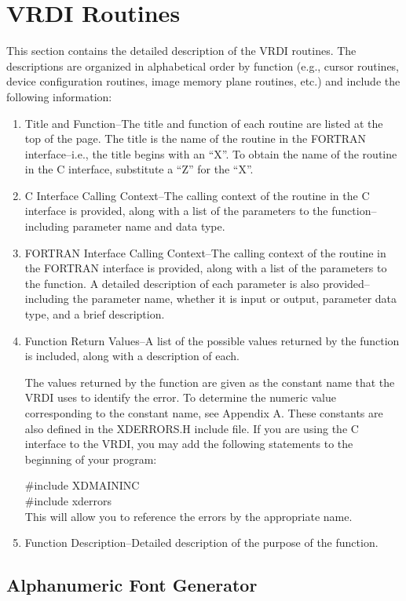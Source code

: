 \section{VRDI Routines}
\label{routines}
This section contains the detailed description of the VRDI
routines.  The descriptions are organized in alphabetical order
by function (e.g., cursor routines, device configuration routines,
image memory plane routines, etc.) and include the following
information:
\begin{enumerate}
\item Title and Function--The title and function of each routine are
listed at the top of the page.  The title is the name of the routine
in the FORTRAN interface--i.e., the title begins with an ``X''.  To
obtain the name of the routine in the C interface, substitute a ``Z''
for the ``X''.
\item C Interface Calling Context--The calling context of the routine
in the C interface is provided, along with a list of the parameters
to the function--including parameter name and data type.
\item FORTRAN Interface Calling Context--The calling context of the
routine in the FORTRAN interface is provided, along with a list of
the parameters to the function.  A detailed description of each
parameter is also provided--including the parameter name, whether
it is input or output, parameter data type, and a brief description.
\item Function Return Values--A list of the possible values returned
by the function is included, along with a description of each.

The values returned by the function are given as the constant
name that the VRDI uses to identify the error.  To determine the
numeric value corresponding to the constant name, see Appendix A.
These constants are also defined in the XDERRORS.H include file.
If you are using the C interface to the VRDI, you may add
the following statements to the beginning of your program:

\#include XDMAININC\\
\#include xderrors\\

This will allow you to reference the errors by the appropriate
name.
\item Function Description--Detailed description of the purpose of
the function.
\end{enumerate}
\newpage
\subsection{Alphanumeric Font Generator}
